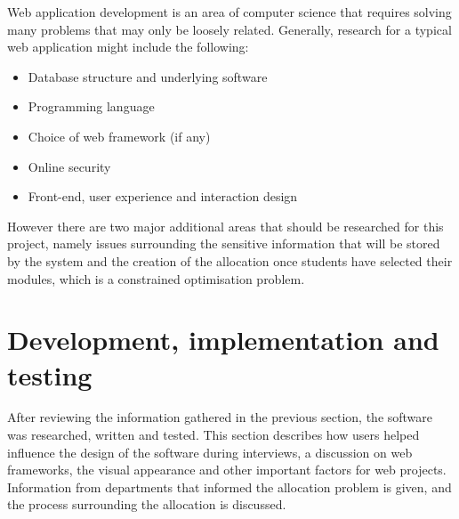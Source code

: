 \documentclass[twoside,draft]{scrartcl}
\let\stdsection\section
\renewcommand\section{\clearpage\stdsection}
\begin{document}

Web application development is an area of computer science that requires
solving many problems that may only be loosely related. Generally, research
for a typical web application might include the following:

\begin{itemize}
  \item Database structure and underlying software
  \item Programming language
  \item Choice of web framework (if any)
  \item Online security
  \item Front-end, user experience and interaction design
\end{itemize}

However there are two major additional areas that should be researched for
this project, namely issues surrounding the sensitive information that will be
stored by the system and the creation of the allocation once students have
selected their modules, which is a constrained optimisation problem.




















\section{Development, implementation and testing}
\label{sec:implementation}


After reviewing the information gathered in the previous section, the software
was researched, written and tested. This section describes how users helped
influence the design of the software during interviews, a discussion on web
frameworks, the visual appearance and other important factors for web
projects. Information from departments that informed the allocation problem is
given, and the process surrounding the allocation is discussed.
\end{document}
